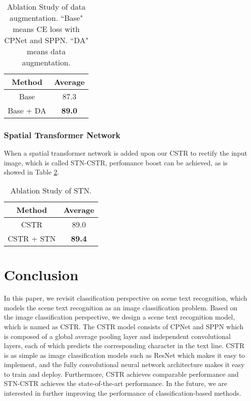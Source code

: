 \documentclass[final]{cvpr}
\begin{document}
\begin{table}[ht]
    \caption{Ablation Study of data augmentation.  ``Base" means CE loss with CPNet and SPPN. ``DA" means data augmentation.}
    \label{table.data_augmentation}
	\centering
	\begin{tabular}{ | c | c |}
		\hline
		 	Method & Average \\ 
		\hline
		Base & 87.3\\
		\hline
		Base + DA & \textbf{89.0}\\
		\hline
	\end{tabular}
\end{table}

\subsubsection{Spatial Transformer Network}
When a spatial transformer network is added upon our CSTR to rectify the input image, which is called STN-CSTR,  perfomance boost can be achieved, as is showed in Table \ref{table.stn}.

\begin{table}[ht]
    \caption{Ablation Study of STN.}
    \label{table.stn}
	\centering
	\begin{tabular}{ | c | c |}
		\hline
		 	Method & Average \\ 
		\hline
		CSTR & 89.0\\
		\hline
		CSTR + STN & \textbf{89.4}\\
		\hline
	\end{tabular}
\end{table}

\section{Conclusion}
In this paper, we revisit classification perspective on scene text recognition, which models the scene text recognition as an image classification problem. Based on the image classification perspective, we design a scene text recognition model, which is named as CSTR.
The CSTR model consists of 
CPNet and SPPN which is composed of a global average pooling layer and independent convolutional layers, each of which predicts the corresponding character in the text line.
CSTR is as simple as image classification models such as ResNet \cite{he2016deep} which makes it easy to implement, and the fully convolutional neural network architecture makes it easy to train and deploy. 
Furthermore, CSTR achieves comparable performance and STN-CSTR achieves the state-of-the-art performance.
In the future, we are interested in further improving the performance of classification-based methods.


{\small


}
\end{document}
